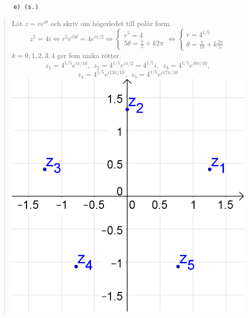 \documentclass[a4paper]{article}
\newcommand{\tskcol}[1]{\textcolor{tskcol}{#1}}
\begin{document}
	\pagebreak
	\texttt{\tskcol{~~~~~~e) (s.)}}
	\begin{quotation}
		\noindent
		Låt $z=re^{i\theta}$ och skriv om högerledet till polär form.
		\[z^5=4i \Leftrightarrow
		r^5e^{i5\theta}=4e^{i\pi/2} \Leftrightarrow
		\begin{cases}
		r^5 = 4 \\
		5\theta=\frac{\pi}{2}+k2\pi
		\end{cases} \Leftrightarrow
		\begin{cases}
		r=4^{1/5} \\
		\theta=\frac{\pi}{10}+k\frac{2\pi}{5}
		\end{cases}\] 
		$k=0,1,2,3,4$ ger fem unika rötter.
		\[z_1=4^{1/5}e^{i\pi/10},~~
		z_2=4^{1/5}e^{i\pi/2}=4^{1/5}i,~~
		z_3=4^{1/5}e^{i9\pi/10},\]
		\[z_4=4^{1/5}e^{i13\pi/10},~~
		z_5=4^{1/5}e^{i17\pi/10}\]
		\includegraphics[scale=0.2]{images/641e.PNG}
	\end{quotation}
	
\end{document}
